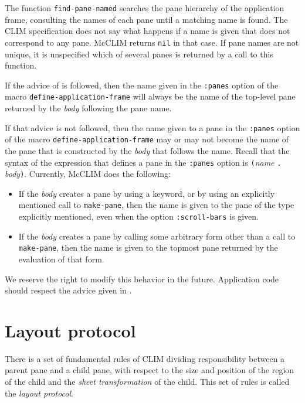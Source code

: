 The function \texttt{find-pane-named} searches the pane hierarchy of
the application frame, consulting the names of each pane until a
matching name is found.  The CLIM specification does not say what
happens if a name is given that does not correspond to any pane.
McCLIM returns \texttt{nil} in that case.  If pane names are not
unique, it is unspecified which of several panes is returned by a call
to this function.

If the advice of  is followed, then the
name given in the \texttt{:panes} option of the macro
\texttt{define-application-frame} will always be the name of the
top-level pane returned by the \textit{body} following the pane name.

If that advice is not followed, then the name given to a pane in the
\texttt{:panes} option of the macro \texttt{define-application-frame}
may or may not become the name of the pane that is constructed by the
\textit{body} that follows the name.  Recall that the syntax of the
expression that defines a pane in the \texttt{:panes} option is
\texttt{(}\textit{name} \texttt{.} \textit{body}\texttt{)}.
Currently, McCLIM does the following:

\begin{itemize}
\item If the \textit{body} creates a pane by using a keyword, or by
  using an explicitly mentioned call to \texttt{make-pane}, then the
  name is given to the pane of the type explicitly mentioned, even
  when the option \texttt{:scroll-bars} is given.
\item If the \textit{body} creates a pane by calling some arbitrary
  form other than a call to \texttt{make-pane}, then the name is
  given to the topmost pane returned by the evaluation of that form.
\end{itemize}

We reserve the right to modify this behavior in the future.
Application code should respect the advice given in
.

\section{Layout protocol}

There is a set of fundamental rules of CLIM dividing responsibility
between a parent pane and a child pane, with respect to the size and
position of the region of the child and the \emph{sheet transformation}
of the child.  This set of rules is called the \emph{layout protocol}.

